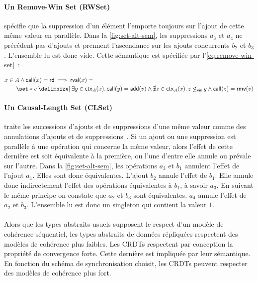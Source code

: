 \paragraph{Un Remove-Win Set (RWSet)} spécifie que la suppression d'un élément l'emporte toujours sur l'ajout de cette même valeur en parallèle.
Dans la \autoref{fig:set-alt-sem}, les suppressions $a_3$ et $a_4$ ne précédent pas d'ajouts et prennent l'ascendance sur les ajouts concurrents $b_2$ et $b_3$.
L'ensemble lu est donc vide.
Cette sémantique est spécifiée par l'\autoref{eq:remove-win-set}~:

\begin{equation}\begin{split}\label{eq:remove-win-set}
\MoveEqLeft x \in A \land \trm{call}(x) = \trm{rd} \implies \trm{rval}(x) =\\
    &\set*{v \given \exists y \in \trm{ctx}_A(x) \qsep \trm{call}(y) = \trm{add}(v) \land \nexists z \in \trm{ctx}_A(x) \qsep z \not\viseq y \land \trm{call}(z) = \trm{rmv}(v)}
\end{split}\end{equation}

\paragraph{Un Causal-Length Set (CLSet)~\autocite{yu2020_clset}} traite les successions d'ajouts et de suppressions d'une même valeur comme des annulations d'ajouts et de suppressions~\autocite{2019_yu_genericundo}.
Si un ajout ou une suppression est parallèle à une opération qui concerne la même valeur, alors l'effet de cette dernière est soit équivalente à la première, ou l'une d'entre elle annule ou prévale sur l'autre.
Dans la \autoref{fig:set-alt-sem}, les opérations $a_3$ et $b_1$ annulent l'effet de l'ajout $a_1$.
Elles sont donc équivalentes.
L'ajout $b_2$ annule l'effet de $b_1$.
Elle annule donc indirectement l'effet des opérations équivalentes à $b_1$, à savoir $a_3$.
En suivant le même principe on constate que $a_2$ et $b_3$ sont équivalentes.
$a_4$ annule l'effet de $a_2$ et $b_3$.
L'ensemble lu est donc un singleton qui contient la valeur $1$.

\paragraph{} Alors que les types abstraits usuels supposent le respect d'un modèle de cohérence séquentiel, les types abstraits de données répliquées respectent des modèles de cohérence plus faibles.
Les \acp{CRDT} respectent par conception la propriété de convergence forte.
Cette dernière est impliquée par leur sémantique.
En fonction du schéma de synchronisation choisit, les \acp{CRDT} peuvent respecter des modèles de cohérence plus fort.


